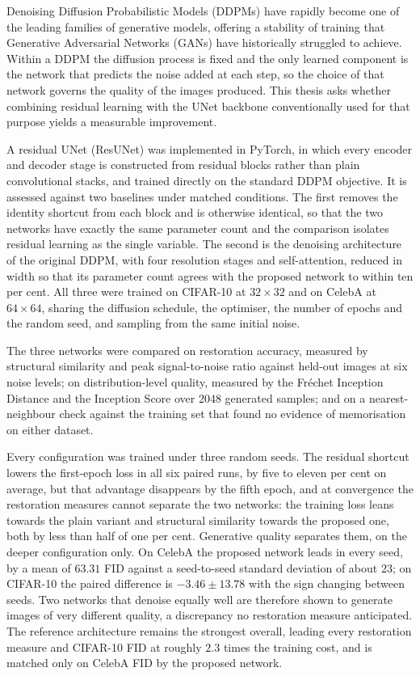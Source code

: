 Denoising Diffusion Probabilistic Models (DDPMs) have rapidly become one of the leading families of
generative models, offering a stability of training that Generative Adversarial Networks (GANs) have
historically struggled to achieve. Within a DDPM the diffusion process is fixed and the only learned
component is the network that predicts the noise added at each step, so the choice of that network
governs the quality of the images produced. This thesis asks whether combining residual learning
with the UNet backbone conventionally used for that purpose yields a measurable improvement.

A residual UNet (ResUNet) was implemented in PyTorch, in which every encoder and decoder stage is
constructed from residual blocks rather than plain convolutional stacks, and trained directly on the
standard DDPM objective. It is assessed against two baselines under matched conditions. The first
removes the identity shortcut from each block and is otherwise identical, so that the two networks
have exactly the same parameter count and the comparison isolates residual learning as the single
variable. The second is the denoising architecture of the original DDPM, with four resolution stages
and self-attention, reduced in width so that its parameter count agrees with the proposed network to
within ten per cent. All three were trained on CIFAR-10 at $32 \times 32$ and on CelebA at $64
\times 64$, sharing the diffusion schedule, the optimiser, the number of epochs and the random seed,
and sampling from the same initial noise.

The three networks were compared on restoration accuracy, measured by structural similarity and peak
signal-to-noise ratio against held-out images at six noise levels; on distribution-level quality,
measured by the Fr\'echet Inception Distance and the Inception Score over 2048 generated samples;
and on a nearest-neighbour check against the training set that found no evidence of memorisation on
either dataset.

Every configuration was trained under three random seeds. The residual shortcut lowers the
first-epoch loss in all six paired runs, by five to eleven per cent on average, but that advantage
disappears by the fifth epoch, and at convergence the restoration measures cannot separate the two
networks: the training loss leans towards the plain variant and structural similarity towards the
proposed one, both by less than half of one per cent. Generative quality separates them, on the
deeper configuration only. On CelebA the proposed network leads in every seed, by a mean of $63.31$
FID against a seed-to-seed standard deviation of about $23$; on CIFAR-10 the paired difference is
$-3.46 \pm 13.78$ with the sign changing between seeds. Two networks that denoise equally well are
therefore shown to generate images of very different quality, a discrepancy no restoration measure
anticipated. The reference architecture remains the strongest overall, leading every restoration
measure and CIFAR-10 FID at roughly $2.3$ times the training cost, and is matched only on CelebA FID
by the proposed network.

